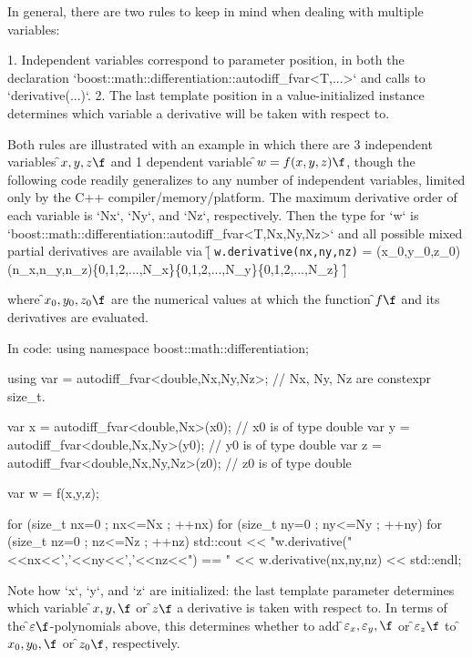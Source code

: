 \documentclass{article}
\begin{document}
In general, there are two rules to keep in mind when dealing with multiple variables:

1. Independent variables correspond to parameter position, in both the declaration
   `boost::math::differentiation::autodiff_fvar<T,...>` and calls to `derivative(...)`.
2. The last template position in a value-initialized instance determines which variable a derivative will be
   taken with respect to.

Both rules are illustrated with an example in which there are 3 independent variables \f$x,y,z\f$ and 1 dependent
variable \f$w=f(x,y,z)\f$, though the following code readily generalizes to any number of independent variables,
limited only by the C++ compiler/memory/platform. The maximum derivative order of each variable is `Nx`, `Ny`,
and `Nz`, respectively. Then the type for `w` is `boost::math::differentiation::autodiff_fvar<T,Nx,Ny,Nz>` and
all possible mixed partial derivatives are available via
\f[
{\tt w.derivative(nx,ny,nz)} =
    (x_0,y_0,z_0)
    \qquad {}\; (n_x,n_y,n_z)\in\{0,1,2,...,N_x\}\times\{0,1,2,...,N_y\}\times\{0,1,2,...,N_z\}
\f]

where \f$x_0, y_0, z_0\f$ are the numerical values at which the function \f$f\f$ and its derivatives are evaluated.

In code:
using namespace boost::math::differentiation;

using var = autodiff_fvar<double,Nx,Ny,Nz>; // Nx, Ny, Nz are constexpr size_t.

var x = autodiff_fvar<double,Nx>(x0);       // x0 is of type double
var y = autodiff_fvar<double,Nx,Ny>(y0);    // y0 is of type double
var z = autodiff_fvar<double,Nx,Ny,Nz>(z0); // z0 is of type double

var w = f(x,y,z);

for (size_t nx=0 ; nx<=Nx ; ++nx)
    for (size_t ny=0 ; ny<=Ny ; ++ny)
        for (size_t nz=0 ; nz<=Nz ; ++nz)
            std::cout << "w.derivative("<<nx<<','<<ny<<','<<nz<<") == " << w.derivative(nx,ny,nz) << std::endl;
\endcode

Note how `x`, `y`, and `z` are initialized: the last template parameter determines which variable
\f$x, y,\f$ or \f$z\f$ a derivative is taken with respect to. In terms of the \f$\varepsilon\f$-polynomials
above, this determines whether to add \f$\varepsilon_x, \varepsilon_y,\f$ or \f$\varepsilon_z\f$ to
\f$x_0, y_0,\f$ or \f$z_0\f$, respectively.
\end{document}
